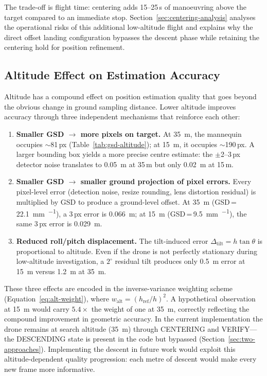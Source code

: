 The trade-off is flight time: centering adds 15--25\,s of manoeuvring above the target compared to an immediate stop.  Section~\ref{sec:centering-analysis} analyses the operational risks of this additional low-altitude flight and explains why the direct offset landing configuration bypasses the descent phase while retaining the centering hold for position refinement.

\subsection{Altitude Effect on Estimation Accuracy}\label{sec:altitude-effect}

Altitude has a compound effect on position estimation quality that goes beyond the obvious change in ground sampling distance.  Lower altitude improves accuracy through three independent mechanisms that reinforce each other:

\begin{enumerate}
  \item \textbf{Smaller GSD $\to$ more pixels on target.}  At \SI{35}{\metre}, the mannequin occupies $\sim$81\,px (Table~\ref{tab:gsd-altitude}); at \SI{15}{\metre}, it occupies $\sim$190\,px.  A larger bounding box yields a more precise centre estimate: the $\pm$2--3\,px detector noise translates to \SI{0.05}{\metre} at 35\,m but only \SI{0.02}{\metre} at 15\,m.

  \item \textbf{Smaller GSD $\to$ smaller ground projection of pixel errors.}  Every pixel-level error (detection noise, resize rounding, lens distortion residual) is multiplied by GSD to produce a ground-level offset.  At \SI{35}{\metre} (GSD\,=\,\SI{22.1}{\milli\metre\per\px}), a 3\,px error is \SI{0.066}{\metre}; at \SI{15}{\metre} (GSD\,=\,\SI{9.5}{\milli\metre\per\px}), the same 3\,px error is \SI{0.029}{\metre}.

  \item \textbf{Reduced roll/pitch displacement.}  The tilt-induced error $\Delta_\mathrm{tilt} = h\tan\theta$ is proportional to altitude.  Even if the drone is not perfectly stationary during low-altitude investigation, a $2^{\circ}$ residual tilt produces only \SI{0.5}{\metre} error at \SI{15}{\metre} versus \SI{1.2}{\metre} at \SI{35}{\metre}.
\end{enumerate}

\noindent These three effects are encoded in the inverse-variance weighting scheme (Equation~\ref{eq:alt-weight}), where $w_\mathrm{alt} = (h_\mathrm{ref}/h)^2$.  A hypothetical observation at \SI{15}{\metre} would carry $5.4\times$ the weight of one at \SI{35}{\metre}, correctly reflecting the compound improvement in geometric accuracy.  In the current implementation the drone remains at search altitude (\SI{35}{\metre}) through CENTERING and VERIFY---the DESCENDING state is present in the code but bypassed (Section~\ref{sec:two-approaches}).  Implementing the descent in future work would exploit this altitude-dependent quality progression: each metre of descent would make every new frame more informative.

